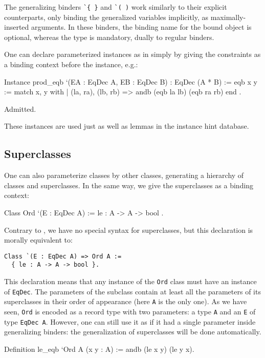 The generalizing binders \verb|`{ }| and \verb|`( )| work similarly to 
their explicit counterparts, only binding the generalized variables
implicitly, as maximally-inserted arguments. In these binders, 
the binding name for the bound object is optional, whereas the type is
mandatory, dually to regular binders.


One can declare parameterized instances as in \Haskell simply by giving
the constraints as a binding context before the instance, e.g.:

\begin{coq_example}
Instance prod_eqb `(EA : EqDec A, EB : EqDec B) : EqDec (A * B) :=
{ eqb x y := match x, y with
  | (la, ra), (lb, rb) => andb (eqb la lb) (eqb ra rb)
  end }.
\end{coq_example}
\begin{coq_eval}
Admitted.
\end{coq_eval}

These instances are used just as well as lemmas in the instance hint database.


\subsection{Superclasses}
\label{classes:superclasses}
One can also parameterize classes by other classes, generating a
hierarchy of classes and superclasses. In the same way, we give the
superclasses as a binding context:

\begin{coq_example*}
Class Ord `(E : EqDec A) :=
  { le : A -> A -> bool }.
\end{coq_example*}

Contrary to \Haskell, we have no special syntax for superclasses, but
this declaration is morally equivalent to:
\begin{verbatim}
Class `(E : EqDec A) => Ord A :=
  { le : A -> A -> bool }.
\end{verbatim}

This declaration means that any instance of the \texttt{Ord} class must
have an instance of \texttt{EqDec}. The parameters of the subclass contain
at least all the parameters of its superclasses in their order of
appearance (here \texttt{A} is the only one).
As we have seen, \texttt{Ord} is encoded as a record type with two parameters:
a type \texttt{A} and an \texttt{E} of type \texttt{EqDec A}. However, one can
still use it as if it had a single parameter inside generalizing binders: the
generalization of superclasses will be done automatically. 
\begin{coq_example*}
Definition le_eqb `{Ord A} (x y : A) := andb (le x y) (le y x).
\end{coq_example*}

